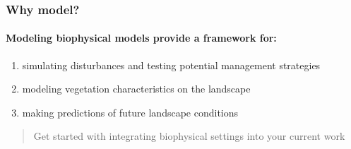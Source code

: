 \documentclass[
]{article}
\providecommand{\tightlist}{%
  \setlength{\itemsep}{0pt}\setlength{\parskip}{0pt}}
\begin{document}
\hypertarget{why-model}{%
\subsubsection{Why model?}\label{why-model}}

\hypertarget{modeling-biophysical-models-provide-a-framework-for}{%
\paragraph{Modeling biophysical models provide a framework
for:}\label{modeling-biophysical-models-provide-a-framework-for}}

\begin{enumerate}
\def\labelenumi{\arabic{enumi}.}
\tightlist
\item
  simulating disturbances and testing potential management strategies\\
\item
  modeling vegetation characteristics on the landscape\\
\item
  making predictions of future landscape conditions
\end{enumerate}

\begin{quote}
Get started with integrating biophysical settings into your current work
\end{quote}

\hypertarget{section}{%
\subsection{}\label{section}}
\end{document}
